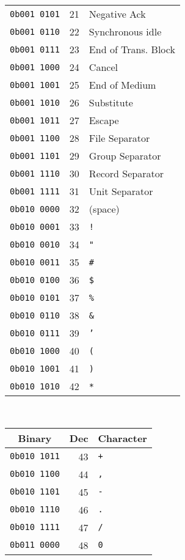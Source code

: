 {\begin{tabular}{c|r|l}
\texttt{0b001 0101} & 21   & Negative Ack    \\
\texttt{0b001 0110} & 22   & Synchronous idle             \\
\texttt{0b001 0111} & 23   & End of Trans. Block    \\
\texttt{0b001 1000} & 24   & Cancel                       \\
\texttt{0b001 1001} & 25   & End of Medium                \\
\texttt{0b001 1010} & 26   & Substitute                   \\
\texttt{0b001 1011} & 27   & Escape                    \\
\texttt{0b001 1100} & 28   & File Separator               \\
\texttt{0b001 1101} & 29   & Group Separator              \\
\texttt{0b001 1110} & 30   & Record Separator             \\
\texttt{0b001 1111} & 31   & Unit Separator               \\
\texttt{0b010 0000} & 32& (space) \\
\texttt{0b010 0001} & 33& \texttt{!} \\
\texttt{0b010 0010} & 34& \texttt{"} \\
\texttt{0b010 0011} & 35& \texttt{\#} \\
\texttt{0b010 0100} & 36& \texttt{\$} \\
\texttt{0b010 0101} & 37& \texttt{\%} \\
  \texttt{0b010 0110} & 38& \texttt{\&} \\
  \texttt{0b010 0111} & 39& \texttt{'} \\
  \texttt{0b010 1000} & 40& \texttt{(} \\
  \texttt{0b010 1001} & 41& \texttt{)} \\
  \texttt{0b010 1010} & 42& \texttt{*} \\
\end{tabular}~~~\begin{tabular}{c|r|l}
Binary & Dec & Character \\
\hline\hline
  \texttt{0b010 1011} & 43& \texttt{+} \\
  \texttt{0b010 1100} & 44& \texttt{,} \\
  \texttt{0b010 1101} & 45& \texttt{-} \\
  \texttt{0b010 1110} & 46& \texttt{.} \\
  \texttt{0b010 1111} & 47& \texttt{/} \\
  \texttt{0b011 0000} & 48& \texttt{0} \\

\end{tabular}}
